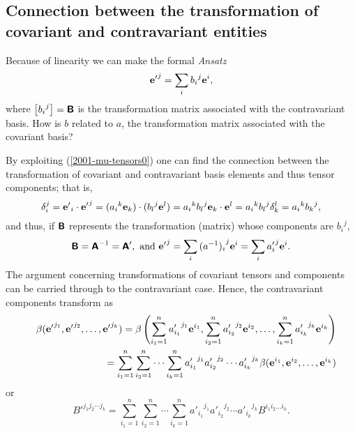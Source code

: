\subsection{Connection between the transformation of covariant and contravariant entities}

Because of linearity we can make the formal {\it Ansatz}
\begin{equation}
{{\bf e}'}^j=\sum_i{b_i}^j{\bf e}^i,
\end{equation}
where $\left[{b_i}^j\right] = \textsf{\textbf{B}}$ is
the transformation matrix associated with the contravariant basis.
How is $b$ related to $a$,
the transformation matrix associated with the covariant basis?

By exploiting (\ref{2001-mu-tensors0}) one can find the connection between
the transformation of covariant and contravariant basis elements and thus
tensor components; that is,
\begin{equation}
\delta_i^j= {{\bf e}'}_i\cdot {{\bf e}'}^j=({a_i}^k{\bf e}_k)\cdot ({b_l}^j{\bf e}^l)={a_i}^k {b_l}^j {\bf e}_k\cdot {\bf e}^l={a_i}^k{b_l}^j \delta_k^l
={a_i}^k {b_k}^j,
\end{equation}
and thus, if $\textsf{\textbf{B}}$ represents the transformation (matrix) whose components are ${b_i}^j$,
\begin{equation}
\textsf{\textbf{B}}=\textsf{\textbf{A}}^{-1} =\textsf{\textbf{A}}',\textrm{ and } {{\bf e}'}^j=\sum_i{(a^{-1})_i}^j{\bf e}^i=\sum_i{ a'_i}^j{\bf e}^i.
\label{2012-m-ch-tensor-tocontrav}
\end{equation}
The argument concerning transformations of covariant tensors and components
can be carried through to the contravariant case.
Hence, the contravariant components transform as
\begin{eqnarray}
&&\beta ( {{\bf e}'}^{j_1},{{\bf e}'}^{j_2},\ldots ,{{\bf e}'}^{j_k})=
\beta \left(
\sum_{i_1=1}^n {a'_{i_1}}^{j_1} {\bf e}^{i_1},
\sum_{i_2=1}^n {a'_{i_2}}^{j_2} {\bf e}^{i_2},
\ldots ,
\sum_{i_k=1}^n {a'_{i_k}}^{j_k} {\bf e}^{i_k}
\right)
\nonumber \\&& \quad
=
\sum_{i_1=1}^n\sum_{i_2=1}^n\cdots \sum_{i_k=1}^n
{a'_{i_1}}^{j_1}{a'_{i_2}}^{j_2}\cdots {a'_{i_k}}^{j_k} \beta ( {\bf e}^{i_1},{\bf e}^{i_2},\ldots ,{\bf e}^{i_k})
 \label{2012-m-ch-tensor-etotccon1}
\end{eqnarray}
or
\begin{equation}
B'^{{j_1}{j_2}\cdots {j_k}}=
\sum_{i_1=1}^n\sum_{i_2=1}^n\cdots \sum_{i_k=1}^n
{a'_{i_1}}^{j_1}{a'_{i_2}}^{j_2}\cdots {a'_{i_k}}^{j_k} B^{i_1 i_2\ldots i_k}.
 \label{2012-m-ch-tensor-etotccon2}
\end{equation}

